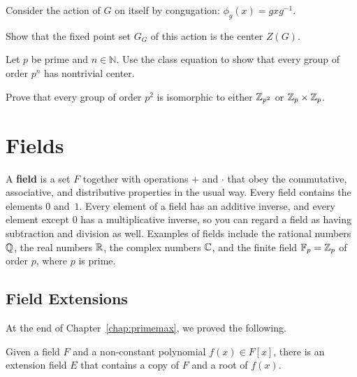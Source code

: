 \begin{problem}
Consider the action of $G$ on itself by congugation: $\phi_g(x) = gxg^{-1}$.
\begin{problemparts}
 \item Show that the fixed point set $G_G$ of this action is the center $Z(G)$.
 \item Let $p$ be prime and $n\in \mathbb{N}$.  Use the class equation to show that every group of order $p^n$ has nontrivial center.
\end{problemparts}
\end{problem}

\begin{problem}\label{prob:p2group}
Prove that every group of order $p^2$ is isomorphic to either $\mathbb{Z}_{p^2}$ or $\mathbb{Z}_p\times \mathbb{Z}_p$.
\begin{annotation}
\end{annotation}
\end{problem}

\chapter{Fields}\label{chap:fields}

A \textbf{field} is a set $F$ together with operations $+$ and $\cdot$ that obey the commutative, associative, and distributive properties in the usual way. Every field contains the elements $0$ and~$1$. Every element of a field has an additive inverse, and every element except $0$ has a multiplicative inverse, so you can regard a field as having subtraction and division as well. Examples of fields include the rational numbers $\mathbb{Q}$, the real numbers $\mathbb{R}$, the complex numbers $\mathbb{C}$, and the finite field $\mathbb{F}_p = \mathbb{Z}_p$ of order $p$, where $p$ is prime.

\section{Field Extensions}

At the end of Chapter~\ref{chap:primemax}, we proved the following.

\begin{theorem}\label{thm:fieldext}
    Given a field $F$ and a non-constant polynomial $f(x)
    \in F[x]$, there is an extension field $E$ that contains a copy of $F$ and a root of $f(x)$.
\end{theorem}


